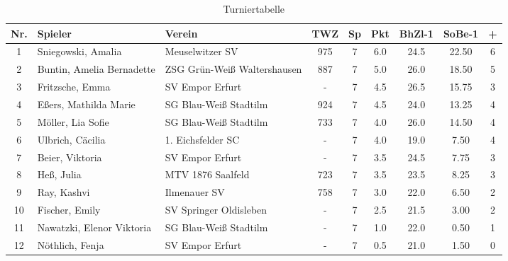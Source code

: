 \begin{table}[H]
\centering
\begin{tabular}{|c|l|l|c|c|c|c|c|c|}
\hline
Nr. & Spieler & Verein & TWZ & Sp & Pkt & BhZl-1 & SoBe-1 & + \\ \hline
1 & Sniegowski, Amalia & Meuselwitzer SV & 975 & 7 & 6.0 & 24.5 & 22.50 & 6 \\
2 & Buntin, Amelia Bernadette & ZSG Grün-Weiß Waltershausen & 887 & 7 & 5.0 & 26.0 & 18.50 & 5 \\
3 & Fritzsche, Emma & SV Empor Erfurt & - & 7 & 4.5 & 26.5 & 15.75 & 3 \\
4 & Eßers, Mathilda Marie & SG Blau-Weiß Stadtilm & 924 & 7 & 4.5 & 24.0 & 13.25 & 4 \\
5 & Möller, Lia Sofie & SG Blau-Weiß Stadtilm & 733 & 7 & 4.0 & 26.0 & 14.50 & 4 \\
6 & Ulbrich, Cäcilia & 1. Eichsfelder SC & - & 7 & 4.0 & 19.0 & 7.50 & 4 \\
7 & Beier, Viktoria & SV Empor Erfurt & - & 7 & 3.5 & 24.5 & 7.75 & 3 \\
8 & Heß, Julia & MTV 1876 Saalfeld & 723 & 7 & 3.5 & 23.5 & 8.25 & 3 \\
9 & Ray, Kashvi & Ilmenauer SV & 758 & 7 & 3.0 & 22.0 & 6.50 & 2 \\
10 & Fischer, Emily & SV Springer Oldisleben & - & 7 & 2.5 & 21.5 & 3.00 & 2 \\
11 & Nawatzki, Elenor Viktoria & SG Blau-Weiß Stadtilm & - & 7 & 1.0 & 22.0 & 0.50 & 1 \\
12 & Nöthlich, Fenja & SV Empor Erfurt & - & 7 & 0.5 & 21.0 & 1.50 & 0 \\ \hline
\end{tabular}
\caption{Turniertabelle}
\label{tab:turniertabelle}
\end{table}